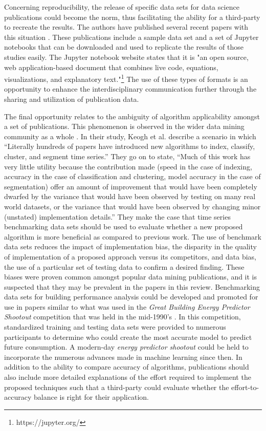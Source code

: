 \documentclass[preprint,12pt,3p]{elsarticle}
\begin{document}
Concerning reproducibility, the release of specific data sets for data science publications could become the norm, thus facilitating the ability for a third-party to recreate the results. The authors have published several recent papers with this situation \cite{miller_forensically_2015,miller_automated_2015}. These publications include a sample data set and a set of Jupyter notebooks that can be downloaded and used to replicate the results of those studies easily. The Jupyter notebook website states that it is "an open source, web application-based document that combines live code, equations, visualizations, and explanatory text."\footnote{https://jupyter.org/} The use of these types of formats is an opportunity to enhance the interdisciplinary communication further through the sharing and utilization of publication data.

The final opportunity relates to the ambiguity of algorithm applicability amongst a set of publications. This phenomenon is observed in the wider data mining community as a whole \cite{keogh_need_2003}. In their study, Keogh et al. describe a scenario in which ``Literally hundreds of papers have introduced new algorithms to index, classify, cluster, and segment time series.'' They go on to state, ``Much of this work has very little utility because the contribution made (speed in the case of indexing, accuracy in the case of classification and clustering, model accuracy in the case of segmentation) offer an amount of improvement that would have been completely dwarfed by the variance that would have been observed by testing on many real world datasets, or the variance that would have been observed by changing minor (unstated) implementation details.'' They make the case that time series benchmarking data sets should be used to evaluate whether a new proposed algorithm is more beneficial as compared to previous work. The use of benchmark data sets reduces the impact of implementation bias, the disparity in the quality of implementation of a proposed approach versus its competitors, and data bias, the use of a particular set of testing data to confirm a desired finding. These biases were proven common amongst popular data mining publications, and it is suspected that they may be prevalent in the papers in this review. Benchmarking data sets for building performance analysis could be developed and promoted for use in papers similar to what was used in the \emph{Great Building Energy Predictor Shootout} competition that was held in the mid-1990's \cite{kreider_predicting_1994}. In this competition, standardized training and testing data sets were provided to numerous participants to determine who could create the most accurate model to predict future consumption. A modern-day \emph{energy predictor shootout} could be held to incorporate the numerous advances made in machine learning since then. In addition to the ability to compare accuracy of algorithms, publications should also include more detailed explanations of the effort required to implement the proposed techniques such that a third-party could evaluate whether the effort-to-accuracy balance is right for their application. 
\end{document}
